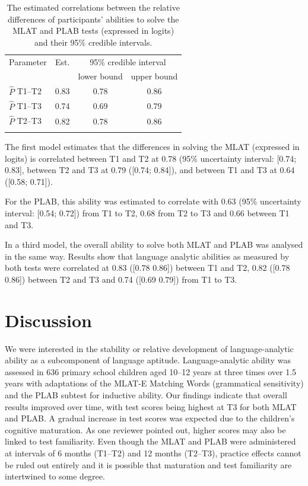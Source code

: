 \documentclass[output=paper]{langsci/langscibook}
\begin{document}
\begin{table}[p]
\caption{\label{tab:10:6}The estimated correlations between the relative differences of participants’ abilities to solve the MLAT and PLAB tests (expressed in logits) and their 95\% credible intervals.}
\begin{tabular}{lccc}
\lsptoprule
Parameter & Est. & \multicolumn{2}{c}{95\% credible interval}\\\cmidrule(lr){3-4}
          &      & lower bound & upper bound\\\midrule
$\hat{P}$ T1--T2 & 0.83 & 0.78 & 0.86\\
$\hat{P}$ T1--T3 & 0.74 & 0.69 & 0.79\\
$\hat{P}$ T2--T3 & 0.82 & 0.78 & 0.86\\
\lspbottomrule
\end{tabular}
\end{table}


The first model estimates that the differences in solving the MLAT (expressed in logits) is correlated between T1 and T2 at 0.78 (95\% uncertainty interval: [0.74; 0.83], between T2 and T3 at 0.79 ([0.74; 0.84]), and between T1 and T3 at 0.64 ([0.58; 0.71]). 

For the PLAB, this ability was estimated to correlate with 0.63 (95\% uncertainty interval: [0.54; 0.72]) from T1 to T2, 0.68 from T2 to T3 and 0.66 between T1 and T3.

In a third model, the overall ability to solve both MLAT and PLAB was analysed in the same way. Results show that language analytic abilities as measured by both tests were correlated at 0.83 ([0.78 0.86]) between T1 and T2, 0.82 ([0.78 0.86]) between T2 and T3 and 0.74 ([0.69 0.79]) from T1 to T3.

\section{Discussion}

We were interested in the stability or relative development of language-analytic ability as a subcomponent of language aptitude. Language-analytic ability was assessed in 636 primary school children aged 10--12 years at three times over 1.5 years with adaptations of the MLAT-E Matching Words (grammatical sensitivity) and the PLAB subtest for inductive ability. Our findings indicate that overall results improved over time, with test scores being highest at T3 for both MLAT and PLAB. A gradual increase in test scores was expected due to the children’s cognitive maturation. As one reviewer pointed out, higher scores may also be linked to test familiarity. Even though the MLAT and PLAB were administered at intervals of 6 months (T1--T2) and 12 months (T2--T3), practice effects cannot be ruled out entirely and it is possible that maturation and test familiarity are intertwined to some degree. 
\end{document}
